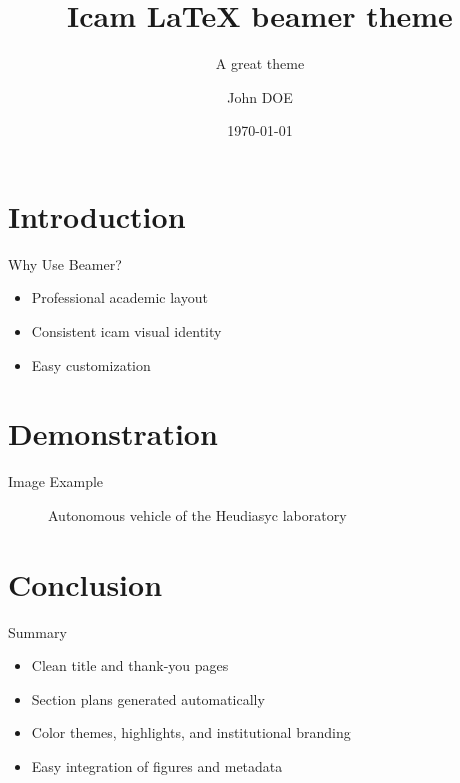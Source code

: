 \documentclass[aspectratio=169]{beamer}
\title{Icam LaTeX beamer theme}
\subtitle{A great theme}
\author{John DOE}
\institute{Icam / Heudiasyc Laboratory}
\date{\today}
\begin{document}
\frame[plain]{\icamtitlepage}

\section{Introduction}

\begin{frame}{Why Use Beamer?}
  \begin{itemize}
    \item Professional academic layout
    \item Consistent icam visual identity
    \item Easy customization
  \end{itemize}
\end{frame}

\section{Demonstration}

\begin{frame}{Image Example}
  \begin{figure}
    \centering
    \caption{Autonomous vehicle of the Heudiasyc laboratory}
  \end{figure}
\end{frame}

\section{Conclusion}

\begin{frame}{Summary}
  \begin{itemize}
    \item Clean title and thank-you pages
    \item Section plans generated automatically
    \item Color themes, highlights, and institutional branding
    \item Easy integration of figures and metadata
  \end{itemize}
\end{frame}

\end{document}
